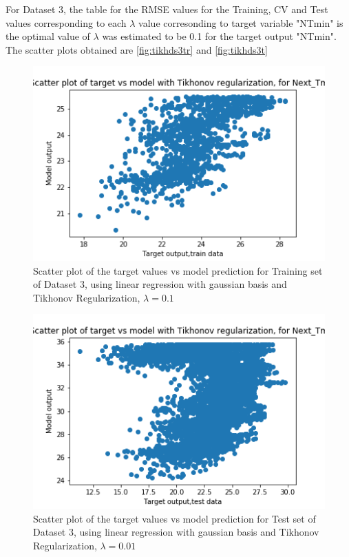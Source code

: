 \documentclass[12pt,a4paper]{article}
\newcommand{\noi}{\noindent}
\begin{document}
 \noi
For Dataset 3, the table for the RMSE values for the Training, CV and Test values corresponding to each $\lambda$ value corresonding to target variable "NTmin" is\\


\noi
the optimal value of $\lambda$ was estimated to be 0.1 for the target output "NTmin". The scatter plots obtained are \autoref{fig:tikhds3tr} and \autoref{fig:tikhds3t}
\begin{figure}[H]
     \centering
     \includegraphics[scale=0.5]{images/scatter_ds3tikhtrainT_min.png}
     \caption{Scatter plot of the target values vs model prediction for Training set of Dataset 3, using linear regression with gaussian basis and Tikhonov Regularization, $\lambda = 0.1 $}
     \label{fig:tikhds3tr}
\end{figure}
\begin{figure}[H]
     \centering
     \includegraphics[scale=0.5]{images/scatter_ds3tikhtestT_min.png}
     \caption{Scatter plot of the target values vs model prediction for Test set of Dataset 3, using linear regression with gaussian basis and Tikhonov Regularization, $\lambda = 0.01 $}
     \label{fig:tikhds3t}
\end{figure}
\end{document}
